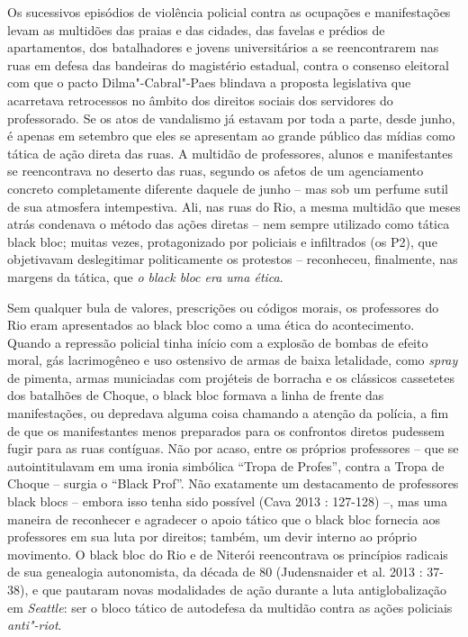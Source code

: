 Os sucessivos episódios de violência policial contra as ocupações e
manifestações levam as multidões das praias e das cidades, das favelas e
prédios de apartamentos, dos batalhadores e jovens universitários a se
reencontrarem nas ruas em defesa das bandeiras do magistério estadual,
contra o consenso eleitoral com que o pacto Dilma"-Cabral"-Paes blindava a
proposta legislativa que acarretava retrocessos no âmbito dos direitos
sociais dos servidores do professorado. Se os atos de vandalismo já
estavam por toda a parte, desde junho, é apenas em setembro que eles se
apresentam ao grande público das mídias como tática de ação direta das
ruas. A multidão de professores, alunos e manifestantes se reencontrava
no deserto das ruas, segundo os afetos de um agenciamento concreto
completamente diferente daquele de junho -- mas sob um perfume sutil de
sua atmosfera intempestiva. Ali, nas ruas do Rio, a mesma multidão que
meses atrás condenava o método das ações diretas -- nem sempre utilizado
como tática black bloc; muitas vezes, protagonizado por policiais e
infiltrados (os P2), que objetivavam deslegitimar politicamente os
protestos -- reconheceu, finalmente, nas margens da tática, que \emph{o
black bloc era uma ética}.

Sem qualquer bula de valores, prescrições ou códigos morais, os
professores do Rio eram apresentados ao black bloc como a uma ética do
acontecimento. Quando a repressão policial tinha início com a explosão
de bombas de efeito moral, gás lacrimogêneo e uso ostensivo de armas de
baixa letalidade, como \emph{spray }de pimenta, armas municiadas com
projéteis de borracha e os clássicos cassetetes dos batalhões de Choque,
o black bloc formava a linha de frente das manifestações, ou depredava
alguma coisa chamando a atenção da polícia, a fim de que os
manifestantes menos preparados para os confrontos diretos pudessem fugir
para as ruas contíguas. Não por acaso, entre os próprios professores --
que se autointitulavam em uma ironia simbólica ``Tropa de Profes'',
contra a Tropa de Choque -- surgia o ``Black Prof''. Não exatamente um
destacamento de professores black blocs -- embora isso tenha sido
possível (Cava 2013 : 127-128) --, mas uma maneira de reconhecer e
agradecer o apoio tático que o black bloc fornecia aos professores em
sua luta por direitos; também, um devir interno ao próprio movimento. O
black bloc do Rio e de Niterói reencontrava os princípios radicais de
sua genealogia autonomista, da década de 80 (Judensnaider et al. 2013 :
37-38), e que pautaram novas modalidades de ação durante a luta
antiglobalização em \emph{Seattle}: ser o bloco tático de autodefesa da
multidão contra as ações policiais \emph{anti"-riot}.

